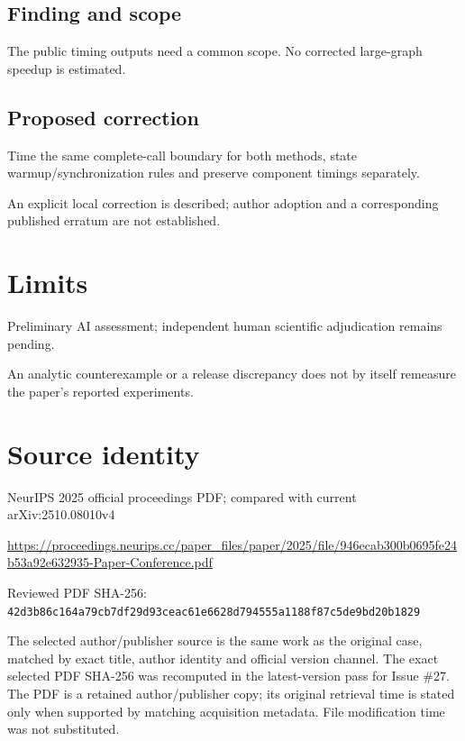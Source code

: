 \documentclass[11pt]{article}
\begin{document}
\subsection*{Finding and scope}

The public timing outputs need a common scope. No corrected large-graph speedup is estimated.

\subsection*{Proposed correction}

Time the same complete-call boundary for both methods, state warmup/synchronization rules and preserve component timings separately.

An explicit local correction is described; author adoption and a corresponding published erratum are not established.

\section*{Limits}

Preliminary AI assessment; independent human scientific adjudication remains pending.\par

An analytic counterexample or a release discrepancy does not by itself remeasure the paper’s reported experiments.\par

\section*{Source identity}

NeurIPS 2025 official proceedings PDF; compared with current arXiv:2510.08010v4

\url{https://proceedings.neurips.cc/paper_files/paper/2025/file/946ecab300b0695fe24b53a92e632935-Paper-Conference.pdf}

Reviewed PDF SHA-256: \nolinkurl{42d3b86c164a79cb7df29d93ceac61e6628d794555a1188f87c5de9bd20b1829}

The selected author/publisher source is the same work as the original case, matched by exact title, author identity and official version channel. The exact selected PDF SHA-256 was recomputed in the latest-version pass for Issue \#27. The PDF is a retained author/publisher copy; its original retrieval time is stated only when supported by matching acquisition metadata. File modification time was not substituted.
\end{document}
